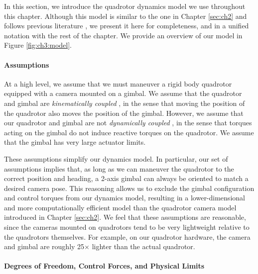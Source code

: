 In this section, we introduce the quadrotor dynamics model we use throughout this chapter.
Although this model is similar to the one in Chapter \ref{sec:ch2} and follows previous literature \cite{mellinger:2011,joubert:2015}, we present it here for completeness, and in a unified notation with the rest of the chapter.
We provide an overview of our model in Figure \ref{fig:ch3:model}.

\paragraph{Assumptions}

At a high level, we assume that we must maneuver a rigid body quadrotor equipped with a camera mounted on a gimbal. 
We assume that the quadrotor and gimbal are \emph{kinematically coupled} \cite{kondak:2013}, in the sense that moving the position of the quadrotor also moves the position of the gimbal.
However, we assume that our quadrotor and gimbal are not \emph{dynamically coupled} \cite{kondak:2013}, in the sense that torques acting on the gimbal do not induce reactive torques on the quadrotor.
We assume that the gimbal has very large actuator limits.

These assumptions simplify our dynamics model. 
In particular, our set of assumptions implies that, as long as we can maneuver the quadrotor to the correct position and heading, a 2-axis gimbal can always be oriented to match a desired camera pose.
This reasoning allows us to exclude the gimbal configuration and control torques from our dynamics model, resulting in a lower-dimensional and more computationally efficient model than the quadrotor camera model introduced in Chapter \ref{sec:ch2}.
We feel that these assumptions are reasonable, since the cameras mounted on quadrotors tend to be very lightweight relative to the quadrotors themselves.
For example, on our quadrotor hardware, the camera and gimbal are roughly 25$\times$ lighter than the actual quadrotor.

\paragraph{Degrees of Freedom, Control Forces, and Physical Limits}

